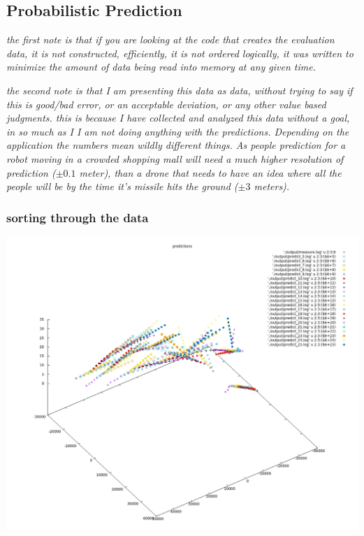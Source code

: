 \documentclass[10pt,a4paper]{article}
\begin{document}
\subsection{Probabilistic Prediction}
\begin{center}
\textit{the first note is that if you are looking at the code that creates the evaluation data, it is not constructed, efficiently, it is not ordered logically, it was written to minimize the amount of data being read into memory at any given time.}

\textit{the second note is that I am presenting this data as data, without trying to say if this is good/bad error, or an acceptable deviation, or any other value based judgments. this is because I have collected and analyzed this data without a \textit{goal}, in so much as I I am not doing anything with the predictions. Depending on the application the numbers \textit{mean} wildly different things. As people prediction for a robot moving in a crowded shopping mall will need a much higher resolution of prediction ($\pm0.1$ meter), than a drone that needs to have an idea where all the people will be by the time it's missile hits the ground ($\pm3$ meters).}
\end{center}
 
\subsubsection{sorting through the data}

\includegraphics[width=\textwidth]{../graphs/prediction_data.png}\\
\end{document}
